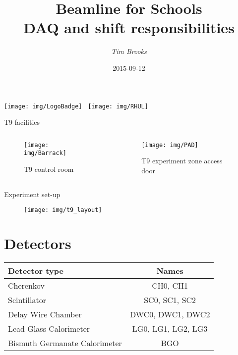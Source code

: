 \documentclass[9pt]{beamer}
\title[Beamline for Schools\hspace{2em}\insertframenumber/
\inserttotalframenumber]{Beamline for Schools\\DAQ and shift responsibilities}
\author{\emph{Tim Brooks}}
\institute{CERN / RHUL}
\date{2015-09-12}
\begin{document}

\begin{frame}
\titlepage{}
\centering
\texttt{[image: img/LogoBadge]}
\,
\texttt{[image: img/RHUL]}
\end{frame}


\begin{frame}{T9 facilities}
\begin{columns}
  \begin{column}{.4\textwidth}
    \vspace*{-0.5cm}
    \begin{figure}\texttt{[image: img/Barrack]}\vspace*{-0.2cm}\caption{T9 control room}\end{figure}\vspace*{-1cm}
  \end{column}
  \begin{column}{.4\textwidth}
    \vspace*{-0.5cm}
    \begin{figure}\texttt{[image: img/PAD]}\vspace*{-0.2cm}\caption{T9 experiment zone access door}\end{figure}\vspace*{-1cm}
  \end{column}
\end{columns}
\end{frame}

\begin{frame}{Experiment set-up}
\begin{figure}\centering
    \texttt{[image: img/t9\_layout]}
\end{figure}
\end{frame}

\section{Detectors}
\begin{frame}
\begin{center}
\begin{tabular}{|l|c|}\hline
    Detector type & Names \\\hline
    Cherenkov & CH0, CH1 \\
    Scintillator & SC0, SC1, SC2 \\
    Delay Wire Chamber & DWC0, DWC1, DWC2 \\
    Lead Glass Calorimeter & LG0, LG1, LG2, LG3 \\
    Bismuth Germanate Calorimeter & BGO \\
\hline
\end{tabular}
\end{center}
\end{frame}
\end{document}

